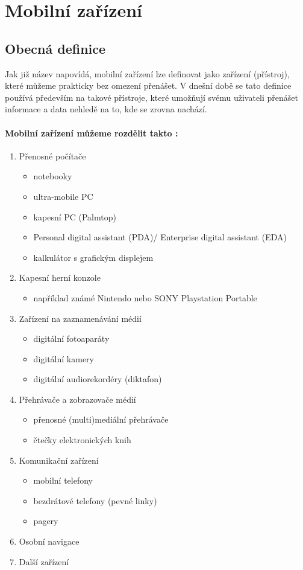 \section{Mobilní zařízení}
\subsection{Obecná definice}

Jak již název napovídá, mobilní zařízení lze definovat jako zařízení (přístroj), které můžeme prakticky bez omezení přenášet. V dnešní době se tato definice používá především na takové přístroje, které umožňují svému uživateli přenášet informace a data nehledě na to, kde se zrovna nachází.

\paragraph{Mobilní zařízení můžeme rozdělit takto \cite{mobile_devices_definition}:}
\begin{enumerate}
	\item Přenosné počítače
	\begin{itemize}
		\item notebooky
		\item ultra-mobile PC
		\item kapesní PC (Palmtop)
		\item Personal digital assistant (PDA)/ Enterprise digital assistant (EDA)
		\item kalkulátor s grafickým displejem
	\end{itemize}
	\item Kapesní herní konzole
	\begin{itemize}
		\item například známé Nintendo nebo SONY Playstation Portable
	\end{itemize}
	\item Zařízení na zaznamenávání médií
	\begin{itemize}
		\item digitální fotoaparáty
		\item digitální kamery
		\item digitální audiorekordéry (diktafon)
	\end{itemize}
	\item Přehrávače a zobrazovače médií
	\begin{itemize}
		\item přenosné (multi)mediální přehrávače
		\item čtečky elektronických knih
	\end{itemize}
	\item Komunikační zařízení
	\begin{itemize}
		\item mobilní telefony
		\item bezdrátové telefony (pevné linky)
		\item pagery
	\end{itemize}
	\item Osobní navigace
	\item Další zařízení
\end{enumerate}

